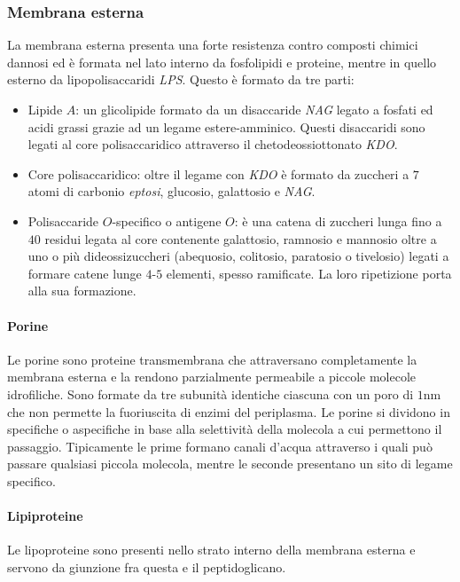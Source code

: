 \subsubsection{Membrana esterna}
La membrana esterna presenta una forte resistenza contro composti chimici dannosi ed \`e formata nel lato interno da fosfolipidi e proteine, mentre in quello esterno da lipopolisaccaridi
\emph{LPS}. Questo \`e formato da tre parti:
\begin{itemize}
	\item Lipide $A$: un glicolipide formato da un disaccaride \emph{NAG} legato a fosfati ed acidi grassi grazie ad un legame estere-amminico. Questi disaccaridi sono legati al core
		polisaccaridico attraverso il chetodeossiottonato \emph{KDO}.
	\item Core polisaccaridico: oltre il legame con \emph{KDO} \`e formato da zuccheri a $7$ atomi di carbonio \emph{eptosi}, glucosio, galattosio e \emph{NAG}. 
	\item Polisaccaride $O$-specifico o antigene $O$: \`e una catena di zuccheri lunga fino a $40$ residui legata al core contenente galattosio, ramnosio e mannosio oltre a uno 
		o pi\`u dideossizuccheri (abequosio, colitosio, paratosio o tivelosio) legati a formare catene lunge $4$-$5$ elementi, spesso ramificate. La loro ripetizione porta alla
		sua formazione. 
\end{itemize}
\paragraph{Porine}
Le porine sono proteine transmembrana che attraversano completamente la membrana esterna e la rendono parzialmente permeabile a piccole molecole idrofiliche. Sono formate da tre 
subunit\`a identiche ciascuna con un poro di $1\si{\nano\metre}$ che non permette la fuoriuscita di enzimi del periplasma. Le porine si dividono in specifiche o aspecifiche in base
alla selettivit\`a della molecola a cui permettono il passaggio. Tipicamente le prime formano canali d'acqua attraverso i quali pu\`o passare qualsiasi piccola molecola, mentre le
seconde presentano un sito di legame specifico. 
\paragraph{Lipiproteine}
Le lipoproteine sono presenti nello strato interno della membrana esterna e servono da giunzione fra questa e il peptidoglicano.
